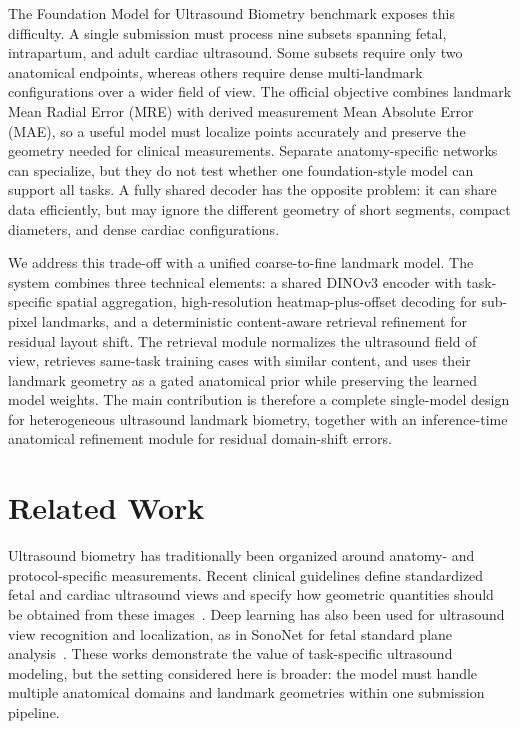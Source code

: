 \documentclass[runningheads]{llncs}
\begin{document}
The Foundation Model for Ultrasound Biometry benchmark exposes this difficulty. A single submission must process nine subsets spanning fetal, intrapartum, and adult cardiac ultrasound. Some subsets require only two anatomical endpoints, whereas others require dense multi-landmark configurations over a wider field of view. The official objective combines landmark Mean Radial Error (MRE) with derived measurement Mean Absolute Error (MAE), so a useful model must localize points accurately and preserve the geometry needed for clinical measurements. Separate anatomy-specific networks can specialize, but they do not test whether one foundation-style model can support all tasks. A fully shared decoder has the opposite problem: it can share data efficiently, but may ignore the different geometry of short segments, compact diameters, and dense cardiac configurations.

We address this trade-off with a unified coarse-to-fine landmark model. The system combines three technical elements: a shared DINOv3 encoder with task-specific spatial aggregation, high-resolution heatmap-plus-offset decoding for sub-pixel landmarks, and a deterministic content-aware retrieval refinement for residual layout shift. The retrieval module normalizes the ultrasound field of view, retrieves same-task training cases with similar content, and uses their landmark geometry as a gated anatomical prior while preserving the learned model weights. The main contribution is therefore a complete single-model design for heterogeneous ultrasound landmark biometry, together with an inference-time anatomical refinement module for residual domain-shift errors.

\section{Related Work}
Ultrasound biometry has traditionally been organized around anatomy- and protocol-specific measurements. Recent clinical guidelines define standardized fetal and cardiac ultrasound views and specify how geometric quantities should be obtained from these images~\cite{isuog2023cardiac}. Deep learning has also been used for ultrasound view recognition and localization, as in SonoNet for fetal standard plane analysis~\cite{baumgartner2017sononet}. These works demonstrate the value of task-specific ultrasound modeling, but the setting considered here is broader: the model must handle multiple anatomical domains and landmark geometries within one submission pipeline.
\end{document}
